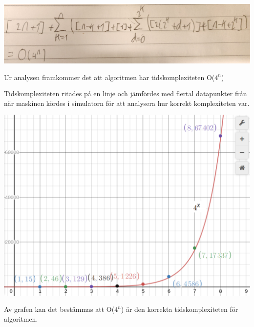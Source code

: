 \begin{center}
    \includegraphics[width=\linewidth]{bilder/komplexitet_utrakning.jpg}
\end{center}
Ur analysen framkommer det att algoritmen har tidskomplexiteten O($4^n$)

Tidskomplexiteten ritades på en linje och jämfördes med flertal datapunkter från när maskinen kördes i simulatorn för att analysera hur korrekt komplexiteten var. 
\begin{center}
    \includegraphics[width=\linewidth]{bilder/graf.png}
\end{center}
Av grafen kan det bestämmas att O($4^n$) är den korrekta tidskomplexiteten för algoritmen. 
\newpage
